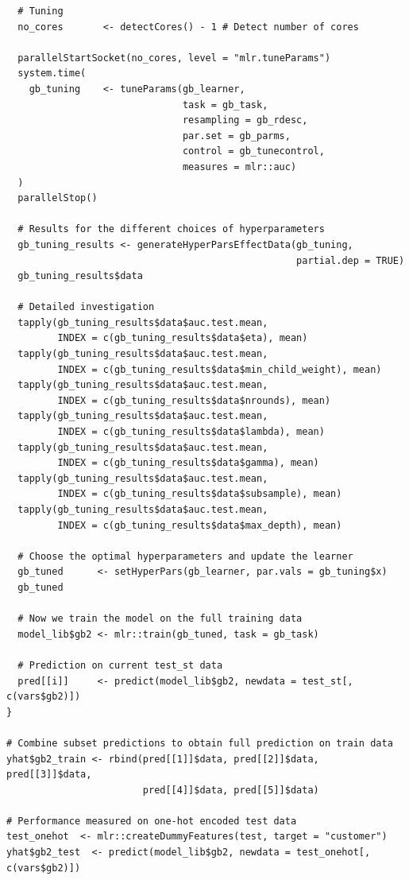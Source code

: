 \documentclass[12pt]{article}
\begin{document}
\begin{lstlisting}
  # Tuning
  no_cores       <- detectCores() - 1 # Detect number of cores
  
  parallelStartSocket(no_cores, level = "mlr.tuneParams")
  system.time(
    gb_tuning    <- tuneParams(gb_learner, 
                               task = gb_task,
                               resampling = gb_rdesc,
                               par.set = gb_parms, 
                               control = gb_tunecontrol,
                               measures = mlr::auc)
  )
  parallelStop()
  
  # Results for the different choices of hyperparameters
  gb_tuning_results <- generateHyperParsEffectData(gb_tuning, 
                                                   partial.dep = TRUE)
  gb_tuning_results$data
  
  # Detailed investigation
  tapply(gb_tuning_results$data$auc.test.mean, 
         INDEX = c(gb_tuning_results$data$eta), mean)
  tapply(gb_tuning_results$data$auc.test.mean, 
         INDEX = c(gb_tuning_results$data$min_child_weight), mean)
  tapply(gb_tuning_results$data$auc.test.mean, 
         INDEX = c(gb_tuning_results$data$nrounds), mean)
  tapply(gb_tuning_results$data$auc.test.mean, 
         INDEX = c(gb_tuning_results$data$lambda), mean)
  tapply(gb_tuning_results$data$auc.test.mean, 
         INDEX = c(gb_tuning_results$data$gamma), mean)
  tapply(gb_tuning_results$data$auc.test.mean, 
         INDEX = c(gb_tuning_results$data$subsample), mean)
  tapply(gb_tuning_results$data$auc.test.mean, 
         INDEX = c(gb_tuning_results$data$max_depth), mean)
  
  # Choose the optimal hyperparameters and update the learner
  gb_tuned      <- setHyperPars(gb_learner, par.vals = gb_tuning$x)
  gb_tuned
  
  # Now we train the model on the full training data 
  model_lib$gb2 <- mlr::train(gb_tuned, task = gb_task)
  
  # Prediction on current test_st data
  pred[[i]]     <- predict(model_lib$gb2, newdata = test_st[, c(vars$gb2)])
}

# Combine subset predictions to obtain full prediction on train data
yhat$gb2_train <- rbind(pred[[1]]$data, pred[[2]]$data, pred[[3]]$data, 
                        pred[[4]]$data, pred[[5]]$data)

# Performance measured on one-hot encoded test data 
test_onehot  <- mlr::createDummyFeatures(test, target = "customer") 
yhat$gb2_test  <- predict(model_lib$gb2, newdata = test_onehot[, c(vars$gb2)])
\end{lstlisting}
\end{document}
